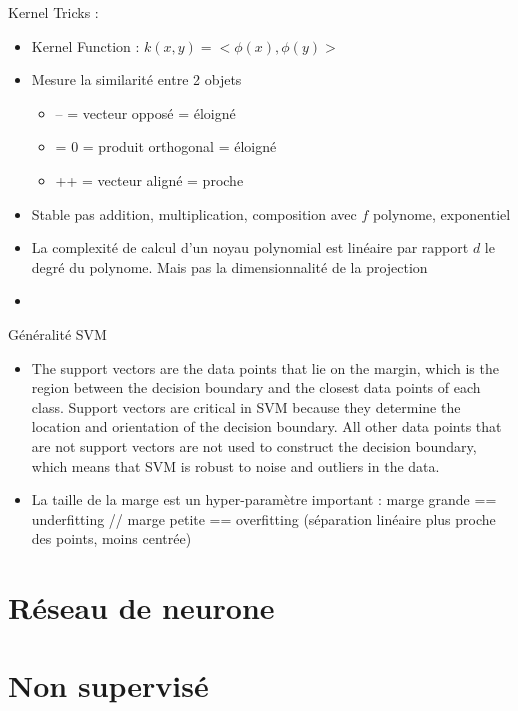 \documentclass{article}
\theoremstyle{plain}%
\theoremstyle{definition}
\theoremstyle{remark}
\begin{document}
Kernel Tricks : 
\begin{itemize}
    \item Kernel Function : $ k(x,y) = <\phi (x), \phi(y)> $
    \item Mesure la similarité entre 2 objets \begin{itemize}
        \item -- = vecteur opposé = éloigné
        \item = 0 = produit orthogonal = éloigné 
        \item ++ = vecteur aligné = proche
    \end{itemize}
    \item Stable pas addition, multiplication, composition avec $ f $ polynome, exponentiel
    \item La complexité de calcul d'un noyau polynomial est linéaire par rapport $d$ le degré du polynome. Mais pas la dimensionnalité de la projection
    \item 
\end{itemize}

Généralité SVM 
\begin{itemize}
    
    \item  The support vectors are the data points that lie on the margin, which is the region between the decision boundary and the closest data points of each class. Support vectors are critical in SVM because they determine the location and orientation of the decision boundary. All other data points that are not support vectors are not used to construct the decision boundary, which means that SVM is robust to noise and outliers in the data.
    \item La taille de la marge est un hyper-paramètre important : marge grande == underfitting // marge petite == overfitting (séparation linéaire plus proche des points, moins centrée)
\end{itemize}

\section{Réseau de neurone}

\section{Non supervisé}
\end{document}
